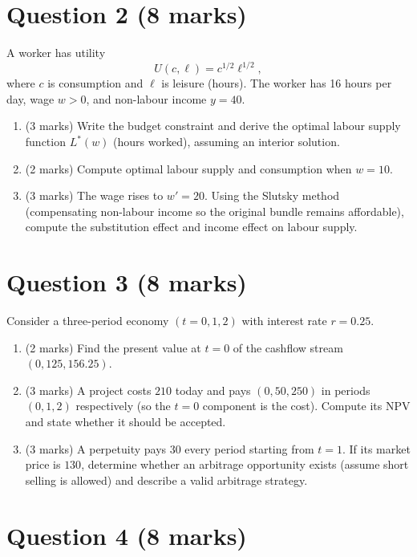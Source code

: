 \documentclass[12pt]{article}
\begin{document}
\bigskip

\section*{Question 2 (8 marks)}

A worker has utility
\[
U(c,\ell)=c^{1/2}\ell^{1/2},
\]
where $c$ is consumption and $\ell$ is leisure (hours). The worker has 16 hours per day, wage $w>0$, and non-labour income $y=40$.

\begin{enumerate}[label=(\alph*)]
\item (3 marks) Write the budget constraint and derive the optimal labour supply function $L^*(w)$ (hours worked), assuming an interior solution.
\item (2 marks) Compute optimal labour supply and consumption when $w=10$.
\item (3 marks) The wage rises to $w'=20$. Using the Slutsky method (compensating non-labour income so the original bundle remains affordable), compute the substitution effect and income effect on labour supply.
\end{enumerate}

\bigskip

\section*{Question 3 (8 marks)}

Consider a three-period economy $(t=0,1,2)$ with interest rate $r=0.25$.

\begin{enumerate}[label=(\alph*)]
\item (2 marks) Find the present value at $t=0$ of the cashflow stream $(0,125,156.25)$.
\item (3 marks) A project costs $210$ today and pays $(0,50,250)$ in periods $(0,1,2)$ respectively (so the $t=0$ component is the cost). Compute its NPV and state whether it should be accepted.
\item (3 marks) A perpetuity pays $30$ every period starting from $t=1$. If its market price is $130$, determine whether an arbitrage opportunity exists (assume short selling is allowed) and describe a valid arbitrage strategy.
\end{enumerate}

\bigskip

\section*{Question 4 (8 marks)}
\end{document}
